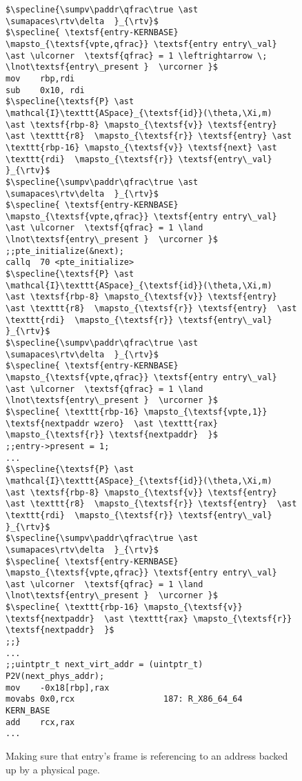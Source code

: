\begin{figure}
\begin{lstlisting}[mathescape]
$\specline{\sumpv\paddr\qfrac\true \ast \sumapaces\rtv\delta  }_{\rtv}$
$\specline{ \textsf{entry-KERNBASE} \mapsto_{\textsf{vpte,qfrac}} \textsf{entry entry\_val} \ast \ulcorner  \textsf{qfrac} = 1 \leftrightarrow \; \lnot\textsf{entry\_present }  \urcorner }$
mov    rbp,rdi
sub    0x10, rdi
$\specline{\textsf{P} \ast \mathcal{I}\texttt{ASpace}_{\textsf{id}}(\theta,\Xi,m)  \ast \textsf{rbp-8} \mapsto_{\textsf{v}} \textsf{entry} \ast \texttt{r8}  \mapsto_{\textsf{r}} \textsf{entry} \ast \texttt{rbp-16} \mapsto_{\textsf{v}} \textsf{next} \ast \texttt{rdi}  \mapsto_{\textsf{r}} \textsf{entry\_val}  }_{\rtv}$
$\specline{\sumpv\paddr\qfrac\true \ast \sumapaces\rtv\delta  }_{\rtv}$
$\specline{ \textsf{entry-KERNBASE} \mapsto_{\textsf{vpte,qfrac}} \textsf{entry entry\_val} \ast \ulcorner  \textsf{qfrac} = 1 \land \lnot\textsf{entry\_present }  \urcorner }$
;;pte_initialize(&next);
callq  70 <pte_initialize>
$\specline{\textsf{P} \ast \mathcal{I}\texttt{ASpace}_{\textsf{id}}(\theta,\Xi,m)  \ast \textsf{rbp-8} \mapsto_{\textsf{v}} \textsf{entry} \ast \texttt{r8}  \mapsto_{\textsf{r}} \textsf{entry}  \ast \texttt{rdi}  \mapsto_{\textsf{r}} \textsf{entry\_val}  }_{\rtv}$
$\specline{\sumpv\paddr\qfrac\true \ast \sumapaces\rtv\delta  }_{\rtv}$
$\specline{ \textsf{entry-KERNBASE} \mapsto_{\textsf{vpte,qfrac}} \textsf{entry entry\_val} \ast \ulcorner  \textsf{qfrac} = 1 \land \lnot\textsf{entry\_present }  \urcorner }$
$\specline{ \texttt{rbp-16} \mapsto_{\textsf{vpte,1}} \textsf{nextpaddr wzero}  \ast \texttt{rax} \mapsto_{\textsf{r}} \textsf{nextpaddr}  }$
;;entry->present = 1;
...
$\specline{\textsf{P} \ast \mathcal{I}\texttt{ASpace}_{\textsf{id}}(\theta,\Xi,m)  \ast \textsf{rbp-8} \mapsto_{\textsf{v}} \textsf{entry} \ast \texttt{r8}  \mapsto_{\textsf{r}} \textsf{entry}  \ast \texttt{rdi}  \mapsto_{\textsf{r}} \textsf{entry\_val}  }_{\rtv}$
$\specline{\sumpv\paddr\qfrac\true \ast \sumapaces\rtv\delta  }_{\rtv}$
$\specline{ \textsf{entry-KERNBASE} \mapsto_{\textsf{vpte,qfrac}} \textsf{entry entry\_val} \ast \ulcorner  \textsf{qfrac} = 1 \land \lnot\textsf{entry\_present }  \urcorner }$
$\specline{ \texttt{rbp-16} \mapsto_{\textsf{v}} \textsf{nextpaddr}  \ast \texttt{rax} \mapsto_{\textsf{r}} \textsf{nextpaddr}  }$
;;}
...
;;uintptr_t next_virt_addr = (uintptr_t) P2V(next_phys_addr);
mov    -0x18[rbp],rax
movabs 0x0,rcx	                187: R_X86_64_64	KERN_BASE
add    rcx,rax
...
\end{lstlisting}
\vspace{-1em}
\caption{Making sure that \textsf{entry}'s frame is referencing to an address backed up by a physical page.}
\label{fig:calltopteinitialize}
\end{figure}

